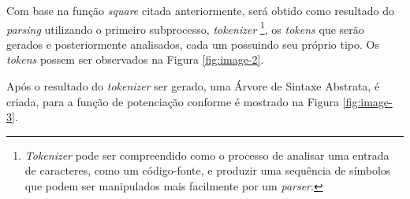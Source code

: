 Com base na função \textit{square} citada anteriormente, será obtido como resultado do
\textit{parsing} utilizando o primeiro subprocesso, \textit{tokenizer}
\footnote[1]{\textit{Tokenizer} pode ser compreendido como o processo de analisar uma
entrada de caracteres, como um código-fonte, e produzir uma sequência de símbolos que
podem ser manipulados mais facilmente por um \textit{parser}.}, os \textit{tokens} que
serão gerados e posteriormente analisados, cada um possuindo seu próprio tipo. Os
\textit{tokens} possem ser observados na Figura \ref{fig:image-2}.

\begin{figure}[h!]
    \centering
\end{figure}

Após o resultado do \textit{tokenizer} ser gerado, uma Árvore de Sintaxe Abstrata, é
criada, para a função de potenciação conforme é mostrado na Figura \ref{fig:image-3}.


